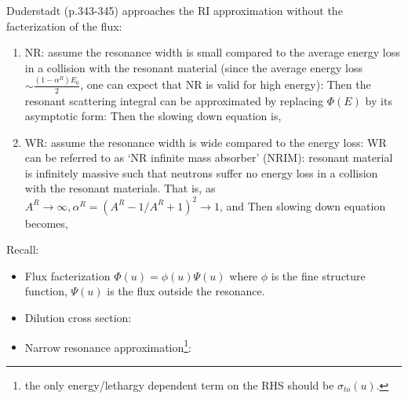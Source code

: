 \documentclass{school-22.211-notes}
\begin{document}
Duderstadt (p.343-345) approaches the RI approximation without the facterization of the flux:
\begin{enumerate}
\item NR: assume the resonance width is small compared to the average energy loss in a collision with the resonant material (since the average energy loss $\sim \frac{(1-\alpha^R)E_0}{2}$, one can expect that NR is valid for high energy): 
  Then the resonant scattering integral can be approximated by replacing $\Phi(E)$ by its asymptotic form: 
  Then the slowing down equation is, 

\item WR: assume the resonance width is wide compared to the energy loss: 
  WR can be referred to as `NR infinite mass absorber' (NRIM): resonant material is infinitely massive such that neutrons suffer no energy loss in a collision with the resonant materials. That is, as $A^R \to \infty, \alpha^R = (A^R - 1/A^R + 1)^2 \to 1$, and 
  Then slowing down equation becomes, 

\end{enumerate}





\clearpage
{}
Recall:
\begin{itemize}
\item Flux facterization $\Phi(u) = \phi(u) \Psi(u)$ where $\phi$ is the fine structure function, $\Psi(u)$ is the flux outside the resonance. 
\item Dilution cross section: 
\item Narrow resonance approximation\footnote{the only energy/lethargy dependent term on the RHS should be $\sigma_{to}(u)$.}:
\end{itemize}
\end{document}
